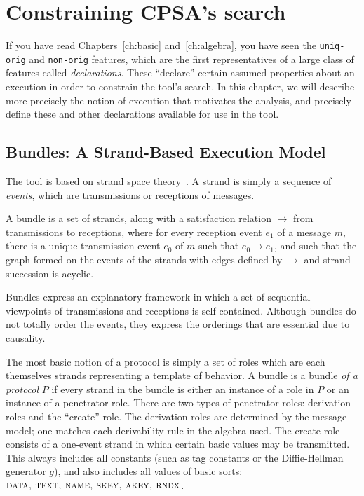 \chapter{Constraining CPSA's search}
\label{ch:declarations}

If you have read Chapters~\ref{ch:basic} and~\ref{ch:algebra}, you
have seen the \texttt{uniq-orig} and \texttt{non-orig} features, which
are the first representatives of a large class of features called
\emph{declarations}.  These ``declare'' certain assumed properties about
an execution in order to constrain the tool's search.  In this chapter,
we will describe more precisely the notion of execution that motivates
the {\cpsa} analysis, and precisely define these and other declarations
available for use in the tool.

\section{Bundles: A Strand-Based Execution Model}
\label{sec:bundles}

  The {\cpsa} tool is based on
strand space theory~\cite{DoghmiGuttmanThayer07}.  A strand is simply
a sequence of \emph{events}, which are transmissions or receptions of
messages.

A bundle is a set of strands, along with a satisfaction relation
$\rightarrow$ from transmissions to receptions, where for every
reception event $e_1$ of a message $m$, there is a unique transmission
event $e_0$ of $m$ such that $e_0 \rightarrow e_1$, and such that the
graph formed on the events of the strands with edges defined by
$\rightarrow$ and strand succession is acyclic.

Bundles express an explanatory framework in which a set of sequential
viewpoints of transmissions and receptions is self-contained.  Although
bundles do not totally order the events, they express the orderings that
are essential due to causality.

The most basic notion of a protocol is simply a set of roles which are
each themselves strands representing a template of behavior.  A bundle
is a bundle \emph{of a protocol} $P$ if every strand in the bundle is
either an instance of a role in $P$ or an instance of a penetrator
role.  There are two types of penetrator roles: derivation roles and
the ``create'' role.  The derivation roles are determined by the
message model; one matches each derivability rule in the algebra used.
The create role consists of a one-event strand in which certain basic
values may be transmitted.  This always includes all constants (such
as tag constants or the Diffie-Hellman generator $g$), and also
includes all values of basic sorts: $\scap{data, text, name, skey,
  akey, rndx}$.

